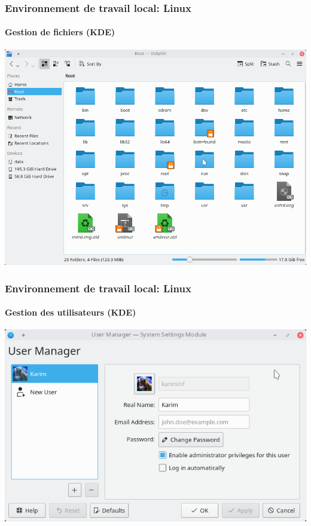 \documentclass[xcolor=table]{beamer}
\begin{document}
\begin{frame}
\frametitle{Environnement de travail local: Linux}
\framesubtitle{Gestion de fichiers (KDE)}

\begin{center}
\includegraphics[height=
.8\textheight]{../img/Bweb01-environnement/kde-files.png}
\end{center}

\end{frame}

\begin{frame}
\frametitle{Environnement de travail local: Linux}
\framesubtitle{Gestion des utilisateurs (KDE)}

\begin{center}
\includegraphics[height=
.8\textheight]{../img/Bweb01-environnement/kde-users.png}
\end{center}

\end{frame}
\end{document}
